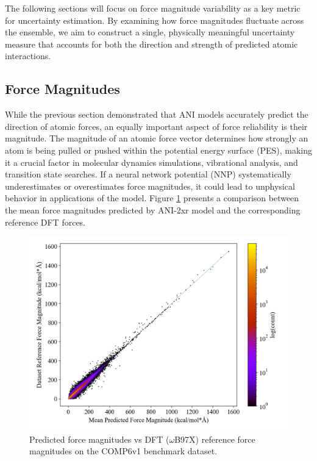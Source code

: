 The following sections will focus on force magnitude variability as a key metric for uncertainty estimation. 
By examining how force magnitudes fluctuate across the ensemble, we aim to construct a single, physically meaningful uncertainty measure that accounts for both the direction and strength of predicted atomic interactions.

\subsection{Force Magnitudes}
\label{subsec:force_magnitudes}

While the previous section demonstrated that ANI models accurately predict the direction of atomic forces, an equally important aspect of force reliability is their magnitude. 
The magnitude of an atomic force vector determines how strongly an atom is being pulled or pushed within the potential energy surface (PES), making it a crucial factor in molecular dynamics simulations, vibrational analysis, and transition state searches. 
If a neural network potential (NNP) systematically underestimates or overestimates force magnitudes, it could lead to unphysical behavior in applications of the model.
Figure \ref{fig:2xr_comp6v1-forces-ani_vs_ref} presents a comparison between the mean force magnitudes predicted by ANI-2xr model and the corresponding reference DFT forces. 


\begin{figure}[H]
    \centering
    \includegraphics[width=1\linewidth]{Images/2xr_forces/2xr_comp6v1_force-dft-vs-mean_ani.png}
    \caption[Mean predicted atomic force magnitude vs DFT reference]{Predicted force magnitudes vs DFT ($\omega$B97X) reference force magnitudes on the COMP6v1 benchmark dataset.}
    \label{fig:2xr_comp6v1-forces-ani_vs_ref}
\end{figure}

